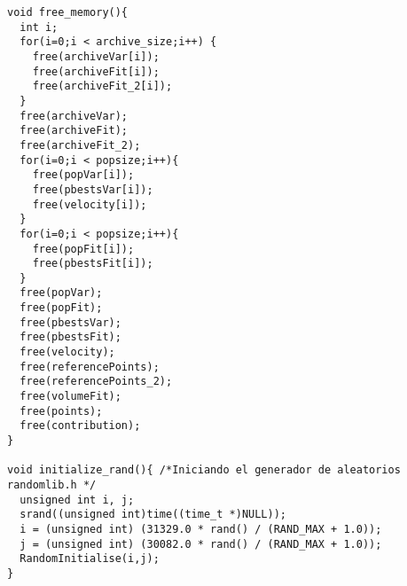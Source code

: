\begin{lstlisting}[style=C]
void free_memory(){
  int i;
  for(i=0;i < archive_size;i++) {
    free(archiveVar[i]);
    free(archiveFit[i]);
    free(archiveFit_2[i]);
  }
  free(archiveVar);
  free(archiveFit);
  free(archiveFit_2);
  for(i=0;i < popsize;i++){
    free(popVar[i]);
    free(pbestsVar[i]);
    free(velocity[i]);
  }
  for(i=0;i < popsize;i++){
    free(popFit[i]);
    free(pbestsFit[i]);
  }
  free(popVar);
  free(popFit);
  free(pbestsVar);
  free(pbestsFit);
  free(velocity);
  free(referencePoints);
  free(referencePoints_2);
  free(volumeFit);
  free(points);
  free(contribution);
}

void initialize_rand(){ /*Iniciando el generador de aleatorios randomlib.h */
  unsigned int i, j;
  srand((unsigned int)time((time_t *)NULL));
  i = (unsigned int) (31329.0 * rand() / (RAND_MAX + 1.0));
  j = (unsigned int) (30082.0 * rand() / (RAND_MAX + 1.0));
  RandomInitialise(i,j);
}


\end{lstlisting}

